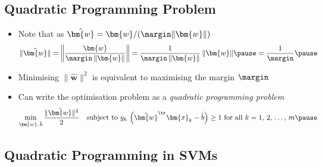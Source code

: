 \begin{slide}
\section{Quadratic Programming Problem}

\begin{PauseHighLight}
  \begin{itemize}
  \item Note that as $\hat{\bm{w}}=\bm{w}/(\margin\|\bm{w}\|)$
    \begin{align*}
      \| \hat{\bm{w}} \| = \left\|\frac{\bm{w}}{\margin\,\|\bm{w}\|}\right\|
      = \frac{1}{\margin\,\|\bm{w}\|} \, \|\bm{w}\| \pause
      = \frac{1}{\margin}\pause
    \end{align*}
  \item Minimising $\| \hat{\bm{w}} \|^2$ is equivalent to maximising the
    margin $\margin$\pause
  \item Can write the optimisation problem as a \textit{quadratic
      programming problem}
    \begin{align*}
      \min_{\hat{\bm{w}},\,\hat{b}} \frac{\|\hat{\bm{w}}\|^2}{2} \quad 
      \mbox{subject to $y_k\,\left(\hat{\bm{w}}^{\tr} \bm{x}_k -
      \hat{b}\right) \geq 1$ for all $k=1,\,2,\,\ldots,\,m$}\pause
    \end{align*}
  \end{itemize}
\end{PauseHighLight}

\end{slide}



\begin{slide}
\section[-2]{Quadratic Programming in SVMs}

\pb\pause{}
\begin{center}
  \pause
\end{center}
\end{slide}



